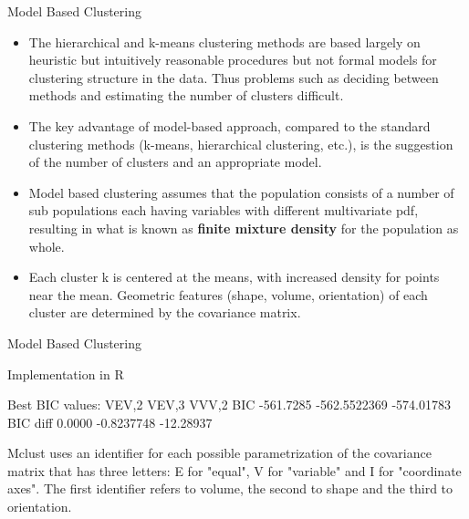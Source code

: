 \documentclass[10pt]{beamer}
\begin{document}
\begin{frame}[fragile]{Model Based Clustering}
\begin{block}{}
\begin{itemize}
\item The hierarchical and k-means clustering methods are based largely on heuristic but intuitively reasonable procedures but not formal models for clustering structure in the data. Thus problems such as deciding between methods and estimating the number of clusters difficult.
\item The key advantage of model-based approach, compared to the standard clustering methods (k-means, hierarchical clustering, etc.), is the suggestion of the number of clusters and an appropriate model.
\item Model based clustering assumes that the population consists of a number of sub populations each having variables with different multivariate pdf, resulting in what is known as \textbf{finite mixture density} for the population as whole.

\item Each cluster k is centered at the means, with increased density for points near the mean. Geometric features (shape, volume, orientation) of each cluster are determined by the covariance matrix.

\end{itemize}
\end{block}
\end{frame}

\begin{frame}[fragile]{Model Based Clustering}
\begin{block}{Implementation in R}
\begin{Schunk}
\begin{Soutput}
Best BIC values:
             VEV,2        VEV,3      VVV,2
BIC      -561.7285 -562.5522369 -574.01783
BIC diff    0.0000   -0.8237748  -12.28937
\end{Soutput}
\end{Schunk}
\end{block}
Mclust uses an identifier for each possible parametrization of the covariance matrix that has three letters: E for "equal", V for "variable" and I for "coordinate axes". The first identifier refers to volume, the second to shape and the third to orientation.
\end{frame}
\end{document}
